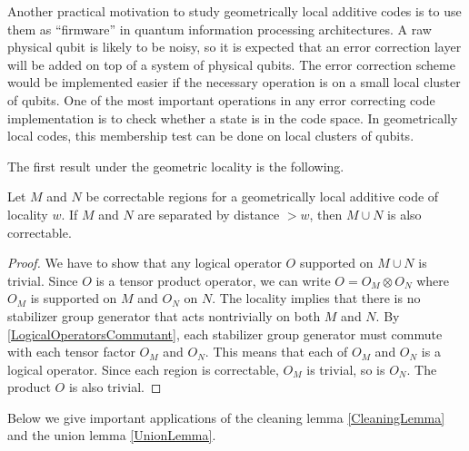 Another practical motivation to study geometrically local additive codes
is to use them as ``firmware'' in quantum information processing architectures.
A raw physical qubit is likely to be noisy,
so it is expected that an error correction layer will be added on top of
a system of physical qubits.
The error correction scheme would be implemented easier
if the necessary operation is on a small local cluster of qubits.
One of the most important operations in any error correcting code implementation
is to check whether a state is in the code space.
In geometrically local codes,
this membership test can be done on local clusters of qubits.


The first result under the geometric locality is the following.
\begin{lem}
Let $M$ and $N$ be correctable regions for a geometrically local additive code of locality $w$.
If $M$ and $N$ are separated by distance $>w$,
then $M \cup N$ is also correctable.
\label{UnionLemma}
\end{lem}
\begin{proof}
We have to show that any logical operator $O$ supported on $M \cup N$ is trivial.
Since $O$ is a tensor product operator,
we can write $O = O_M \otimes O_N$ where $O_M$ is supported on $M$
and $O_N$ on $N$.
The locality implies that there is no stabilizer group generator
that acts nontrivially on both $M$ and $N$.
By \ref{LogicalOperatorsCommutant}, each stabilizer group generator must commute
with each tensor factor $O_M$ and $O_N$.
This means that each of $O_M$ and $O_N$ is a logical operator.
Since each region is correctable, $O_M$ is trivial, so is $O_N$.
The product $O$ is also trivial.
\end{proof}

Below we give important applications of the cleaning lemma \ref{CleaningLemma}
and the union lemma \ref{UnionLemma}.

